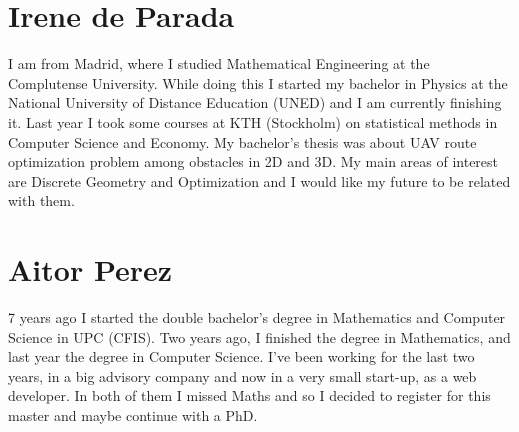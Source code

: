 \documentclass[11pt]{amsart}
\begin{document}
\section*{Irene de Parada}

I am from Madrid, where I studied Mathematical Engineering at the Complutense University. While doing this I started my bachelor in Physics  at the National University of Distance Education (UNED) and I am currently finishing it. Last year I took some courses at KTH (Stockholm) on statistical methods in Computer Science and Economy. My  bachelor's thesis was about UAV route optimization problem  among obstacles in 2D and 3D. My main areas of interest are Discrete Geometry and Optimization and I would like my future to be related with them.

\section*{Aitor Perez}
7 years ago I started the double bachelor's degree in Mathematics and Computer Science in UPC (CFIS). Two years ago, I finished the degree in Mathematics, and last year the degree in Computer Science. I've been working for the last two years, in a big advisory company and now in a very small start-up, as a web developer. In both of them I missed Maths and so I decided to register for this master and maybe continue with a PhD.
\end{document}
